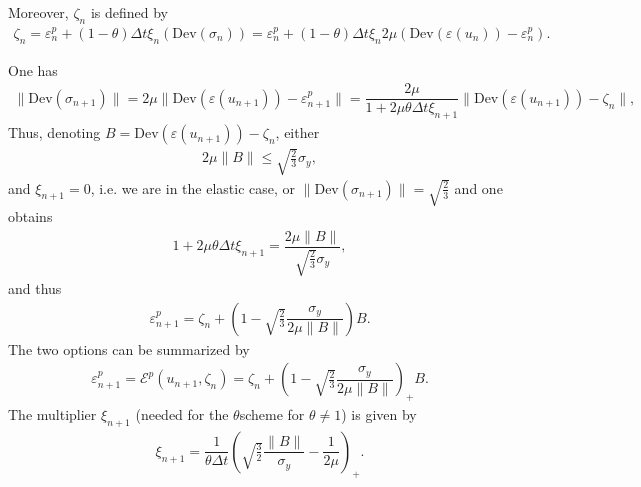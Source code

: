 \documentclass[a4paper,11pt,english]{sphinxmanual}
\begin{document}
Moreover, \(\zeta_n\) is defined by
\begin{equation*}
\begin{split}\zeta_n = \varepsilon^p_n+(1-\theta)\Delta t \xi_n (\mbox{Dev}(\sigma_n)) = \varepsilon^p_n+(1-\theta)\Delta t \xi_n 2\mu \left(\mbox{Dev}(\varepsilon(u_{n}))-\varepsilon^p_n\right).\end{split}
\end{equation*}

One has
\begin{equation*}
\begin{split}\|\mbox{Dev}(\sigma_{n+1})\| = 2\mu\|\mbox{Dev}(\varepsilon(u_{n+1})) -\varepsilon^p_{n+1}\| = \dfrac{2\mu}{1+2\mu\theta\Delta t \xi_{n+1}}\|\mbox{Dev}(\varepsilon(u_{n+1})) - \zeta_n\|,\end{split}
\end{equation*}
Thus, denoting \(B = \mbox{Dev}(\varepsilon(u_{n+1})) - \zeta_n\), either
\begin{equation*}
\begin{split}2\mu\|B\| \le \sqrt{\frac{2}{3}}\sigma_y,\end{split}
\end{equation*}
and \(\xi_{n+1} = 0\), i.e. we are in the elastic case, or  \(\|\mbox{Dev}(\sigma_{n+1})\| =  \sqrt{\frac{2}{3}}\) and one obtains
\begin{equation*}
\begin{split}1+2\mu\theta\Delta t \xi_{n+1} = \dfrac{2\mu\|B\|}{\sqrt{\frac{2}{3}}\sigma_y},\end{split}
\end{equation*}
and thus
\begin{equation*}
\begin{split}\varepsilon^p_{n+1} = \zeta_n + \left( 1 - \sqrt{\frac{2}{3}}\dfrac{\sigma_y}{2\mu\|B\|}\right) B.\end{split}
\end{equation*}
The two options can be summarized by
\begin{equation*}
\begin{split}\varepsilon^p_{n+1} = {\mathscr E}^p(u_{n+1}, \zeta_{n}) = \zeta_n + \left( 1 - \sqrt{\frac{2}{3}}\dfrac{\sigma_y}{2\mu\|B\|}\right)_+ B.\end{split}
\end{equation*}
The multiplier \(\xi_{n+1}\) (needed for the \(\theta\)\sphinxhyphen{}scheme for \(\theta \ne 1\)) is given by
\begin{equation*}
\begin{split}\xi_{n+1} = \dfrac{1}{\theta\Delta t}\left(\sqrt{\frac{3}{2}}\dfrac{\|B\|}{\sigma_y} - \dfrac{1}{2\mu}\right)_+.\end{split}
\end{equation*}
\end{document}
